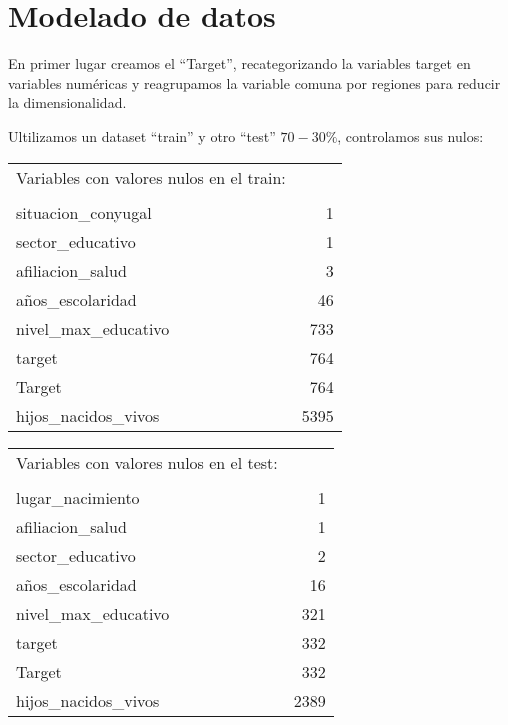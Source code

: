 \documentclass[a4paper]{article}
\begin{document}
\newpage

\section{Modelado de datos}
    
    En primer lugar creamos el ``Target'', recategorizando la variables target en variables numéricas y reagrupamos la variable comuna por regiones para reducir la dimensionalidad.

    Ultilizamos un dataset ``train'' y otro ``test'' $70-30\%$, controlamos sus nulos:
    \begin{center}
        \begin{tabular}{lr}
            Variables con valores nulos en el train: & \\
            & \\
            situacion\_conyugal           & 1 \\
            sector\_educativo             & 1 \\
            afiliacion\_salud             & 3 \\
            años\_escolaridad             & 46\\
            nivel\_max\_educativo          & 733\\
            target                       & 764\\
            Target                       & 764\\
            hijos\_nacidos\_vivos          & 5395
        \end{tabular}
    \end{center}

    \begin{center}
        \begin{tabular}{lr}
            Variables con valores nulos en el test: & \\
            & \\
            lugar\_nacimiento       & 1 \\
            afiliacion\_salud       & 1 \\
            sector\_educativo       & 2 \\
            años\_escolaridad       & 16\\
            nivel\_max\_educativo   & 321\\
            target                  & 332\\
            Target                  & 332\\
            hijos\_nacidos\_vivos     & 2389\\
        \end{tabular}
    \end{center}
\end{document}
